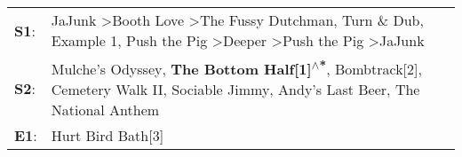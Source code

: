 \begin{supertabular}{p{0.03\textwidth}p{0.92\textwidth}}
 \textbf{S1}:  &  JaJunk\textsuperscript{} \textgreater \enspace Booth Love\textsuperscript{} \textgreater \enspace The Fussy Dutchman\textsuperscript{}, \enspace Turn \& Dub\textsuperscript{}, \enspace Example 1\textsuperscript{}, \enspace Push the Pig\textsuperscript{} \textgreater \enspace Deeper\textsuperscript{} \textgreater \enspace Push the Pig\textsuperscript{} \textgreater \enspace JaJunk\textsuperscript{}  \enspace  \\
 \textbf{S2}:  &                                                                                 Mulche's Odyssey\textsuperscript{}, \enspace \textbf{The Bottom Half[1]\textsuperscript{$\wedge$*}}, \enspace Bombtrack[2]\textsuperscript{}, \enspace Cemetery Walk II\textsuperscript{}, \enspace Sociable Jimmy\textsuperscript{}, \enspace Andy's Last Beer\textsuperscript{}, \enspace The National Anthem\textsuperscript{}  \enspace  \\
 \textbf{E1}:  &                                                                                                                                                                                                                                                                                                                                                                               Hurt Bird Bath[3]\textsuperscript{}  \enspace  \\
\end{supertabular}
